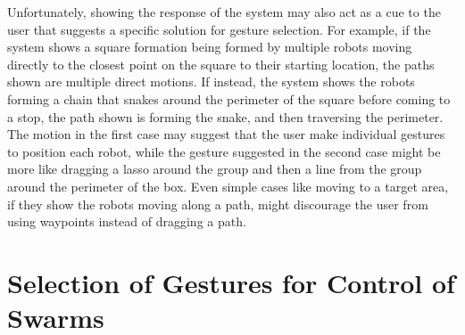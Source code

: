 Unfortunately, showing the response of the system may also act as a cue to the user that suggests a specific solution for gesture selection. 
For example, if the system shows a square formation being formed by multiple robots moving directly to the closest point on the square to their starting location, the paths shown are multiple direct motions. 
If instead, the system shows the robots forming a chain that snakes around the perimeter of the square before coming to a stop, the path shown is forming the snake, and then traversing the perimeter. 
The motion in the first case may suggest that the user make individual gestures to position each robot, while the gesture suggested in the second case might be more like dragging a lasso around the group and then a line from the group around the perimeter of the box. 
Even simple cases like moving to a target area, if they show the robots moving along a path, might discourage the user from using waypoints instead of dragging a path.



\chapter{Selection of Gestures for Control of Swarms}

